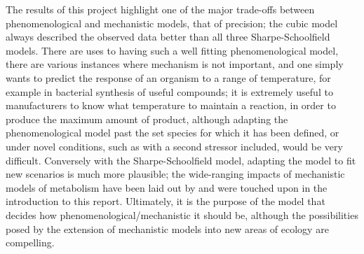 \documentclass[a4paper, 11pt]{article}
\begin{document}
\begin{linenumbers}
The results of this project highlight one of the major trade-offs between phenomenological and mechanistic models, that of precision; the cubic model always described the observed data better than all three Sharpe-Schoolfield models. There are uses to having such a well fitting phenomenological model, there are various instances where mechanism is not important, and one simply wants to predict the response of an organism to a range of temperature, for example in bacterial synthesis of useful compounds; it is extremely useful to manufacturers to know what temperature to maintain a reaction, in order to produce the maximum amount of product, although adapting the phenomenological model past the set species for which it has been defined, or under novel conditions, such as with a second stressor included, would be very difficult. Conversely with the Sharpe-Schoolfield model, adapting the model to fit new scenarios is much more plausible; the wide-ranging impacts of mechanistic models of metabolism have been laid out by \cite{metabTheory} and were touched upon in the introduction to this report. Ultimately, it is the purpose of the model that decides how phenomenological/mechanistic it should be, although the possibilities posed by the extension of mechanistic models into new areas of ecology are compelling.

\end{linenumbers}



\end{document}
